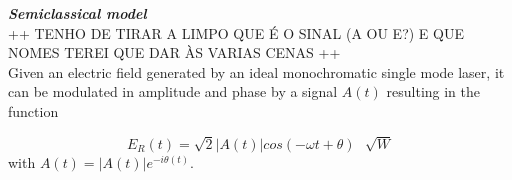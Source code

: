 \begin{bibunit}[plain]



\noindent
{\bf \em Semiclassical model}\\


++ TENHO DE TIRAR A LIMPO QUE É O SINAL (A OU E?) E QUE NOMES TEREI QUE DAR ÀS VARIAS CENAS ++\\

Given an electric field generated by an ideal monochromatic single mode laser, it can be modulated in amplitude and phase by a signal $A(t)$ resulting in the function

\begin{equation}
    E_R(t)=\sqrt{2} |A(t)| cos\left(-\omega t + \theta\right) \,\,\,\, \sqrt{W}
\end{equation}
with $A(t)=|A(t)|e^{-i\theta(t)}$.


\end{bibunit}
